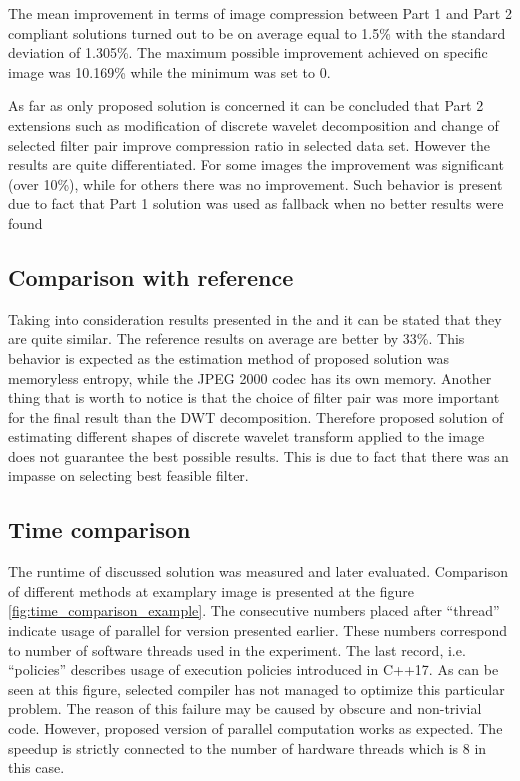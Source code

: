 The mean improvement in terms of image compression between Part 1 and Part 2 compliant solutions
turned out to be on average equal to 1.5\% with the standard deviation of 1.305\%. The maximum
possible improvement achieved on specific image was 10.169\% while the minimum was set to 0.

As far as only proposed solution is concerned it can be concluded that Part 2 extensions such as modification
of discrete wavelet decomposition and change of selected filter pair improve compression ratio
in selected data set. However the results are quite differentiated. For some images the improvement
was significant (over 10\%), while for others there was no improvement. Such behavior is present
due to fact that Part 1 solution was used as fallback when no better results were found


\subsection{Comparison with reference} \label{sec:results_comparison}

Taking into consideration results presented in the  and 
it can be stated that they are quite similar. The reference results on average are better by 33\%.
This behavior is expected as the estimation method of proposed solution was memoryless entropy,
while the JPEG 2000 codec has its own memory. Another thing that is worth to notice is that the
choice of filter pair was more important for the final result than the DWT decomposition.
Therefore proposed solution of estimating different shapes of discrete wavelet transform applied
to the image does not guarantee the best possible results. This is due to fact that there was
an impasse on selecting best feasible filter.

\subsection{Time comparison} \label{sec:time_results}

The runtime of discussed solution was measured and later evaluated. Comparison of different
methods at examplary image is presented at the figure \ref{fig:time_comparison_example}. The consecutive
numbers placed after ``thread'' indicate usage of parallel for version presented earlier.
These numbers correspond to number of software threads used in the experiment. The last record, i.e.
``policies'' describes usage of execution policies introduced in C++17. As can be seen at this
figure, selected compiler has not managed to optimize this particular problem. The reason of
this failure may be caused by obscure and non-trivial code. However, proposed version of parallel
computation works as expected. The speedup is strictly connected to the number of hardware threads
which is 8 in this case.

